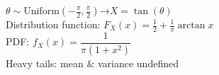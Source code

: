 \documentclass[preview]{standalone}
\begin{document}
\(\theta \sim \mathrm{Uniform}(-\frac{\pi}{2},\frac{\pi}{2})\)\;→\;\(X=\tan(\theta)\)\\Distribution function: \(F_X(x)=\tfrac12 + \tfrac{1}{\pi}\arctan x\)\\PDF: \(f_X(x)=\dfrac{1}{\pi(1+x^2)}\)\\Heavy tails: mean & variance undefined\\
\end{document}
